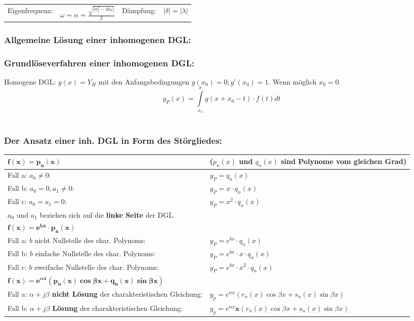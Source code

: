 \begin{tabular}{p{2cm}p{5cm}p{2cm}p{4cm}}
	Eigenfrequenz: & $\omega = \alpha = \frac{\sqrt{|a_1^2 - 4a_0|}}{2}$ &
	Dämpfung: &  $|\delta| = |\lambda|$\\
\end{tabular}

\subsubsection{Allgemeine Lösung einer inhomogenen DGL:\quad{}}

\subsubsection{Grundlöseverfahren einer inhomogenen DGL:\quad{}}
Homogene DGL: $g(x) = Y_H$ mit den Anfangsbedingungen $g(x_0) = 0; g'(x_0) = 1$. Wenn möglich $x_0 = 0$.\\
$$y_P(x)=\int\limits_{x_o}^{x} g(x+x_0-t)\cdot f(t)dt$$\\



\subsubsection{Der Ansatz einer inh. DGL in Form des Störgliedes:}

\begin{tabular}{|p{10cm}  p{8cm}|}
	\hline 	$\mathbf{f(x)=p_n(x)}$ & 
		($p_n(x)$ und $q_n(x)$ sind Polynome vom gleichen Grad)\\

	 \hline	Fall a: $a_0\neq 0$:          & $y_P = q_n(x)$\\
		Fall b: $a_0 = 0 , a_1\neq 0$:& $y_P=x\cdot q_n(x)$\\
		Fall c: $a_0=a_1=0$:          & $y_P=x^2\cdot q_n(x)$\\
		$a_0$ und $a_1$ beziehen sich auf die \textbf{linke Seite} der DGL & \\
	\hline
	\hline
 		$\mathbf{f(x)=e^{bx}\cdot p_n(x)}$ & \\
	\hline	Fall a: $b$ nicht Nullstelle des char. Polynoms:    &
		$y_P=e^{bx}\cdot q_n(x)$\\
		Fall b: $b$ einfache Nullstelle des char. Polynoms: &
		$y_P=e^{bx}\cdot x \cdot q_n(x)$\\
		Fall c: $b$ zweifache Nullstelle des char. Polynoms:&
		$y_P=e^{bx}\cdot x^2\cdot q_n(x)$\\
	\hline
	\hline
		$\mathbf{f(x) = e^{\alpha x}(p_n(x)\cos \beta x + q_n(x)\sin \beta x)}$ & \\
	 \hline	Fall a: $\alpha + j\beta$ \textbf{nicht Lösung} der charakteristischen Gleichung: &
		$y_p = e^{\alpha x}(r_n(x)\cos \beta x + s_n(x)\sin \beta x)$ \\
		Fall b: $\alpha + j\beta$ \textbf{Lösung} der charakteristischen Gleichung: &
		$y_p = e^{\alpha x} \textbf{x}(r_n(x) \cos \beta x + s_n(x) \sin \beta x)$\\
	\hline
\end{tabular}


